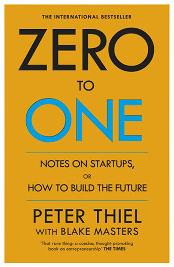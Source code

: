 \documentclass[aspectratio=169,xcolor=x11names,table]{beamer}
\begin{document}
\begin{frame}
\begin{columns}
\begin{column}{0.3\linewidth}
\begin{figure}
				\includegraphics[width=\columnwidth]{zero}
			\end{figure}
		\end{column}
	\end{columns}
\end{frame}
\end{document}

